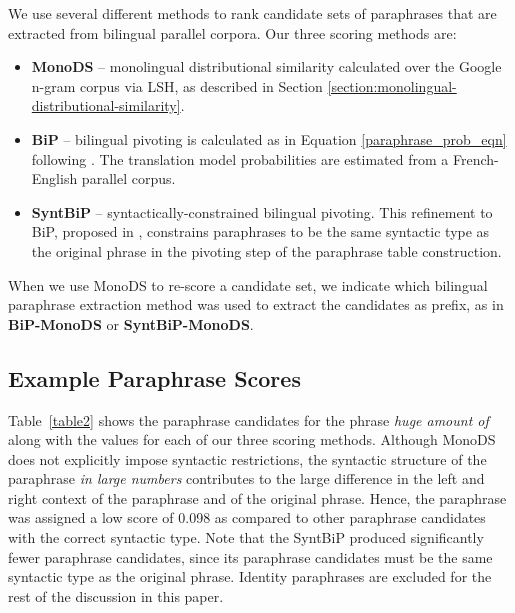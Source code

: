 \documentclass[11pt]{article}
\begin{document}
We use several different methods to rank candidate sets of paraphrases that are extracted from bilingual parallel corpora.  Our three scoring methods are: 
\begin{itemize}
\item {\bf MonoDS} -- monolingual distributional similarity calculated over the Google n-gram corpus via LSH,
 as described in Section \ref{section:monolingual-distributional-similarity}.
\vspace{-.2cm}
\item {\bf BiP} -- bilingual pivoting is calculated as in Equation \ref{paraphrase_prob_eqn} following .  The translation model probabilities are estimated from a French-English parallel corpus.
\vspace{-.2cm}
\item {\bf SyntBiP} -- syntactically-constrained bilingual pivoting.  This refinement to BiP, proposed in  , constrains paraphrases to be the same syntactic type as the original phrase in the pivoting step of the paraphrase table construction.
\vspace{-.2cm}
\end{itemize}
When we use MonoDS to re-score a candidate set, we indicate which bilingual paraphrase extraction method was used to extract the candidates as prefix, as in {\bf BiP-MonoDS} or {\bf SyntBiP-MonoDS}.


\subsection{Example Paraphrase Scores}

Table~\ref{table2} shows the paraphrase candidates for the phrase {\em huge amount of} along with the values for each of our three scoring methods. Although MonoDS does not explicitly impose syntactic restrictions, the syntactic structure of the paraphrase {\em in large numbers} contributes to the large difference in the left and right context of the paraphrase and of the original phrase. Hence, the paraphrase was assigned a low score of 0.098 as compared to other paraphrase candidates with the correct syntactic type. Note that the SyntBiP produced significantly fewer paraphrase candidates, since its paraphrase candidates must be the same syntactic type as the original phrase. Identity paraphrases are excluded for the rest of the discussion in this paper.
\end{document}
